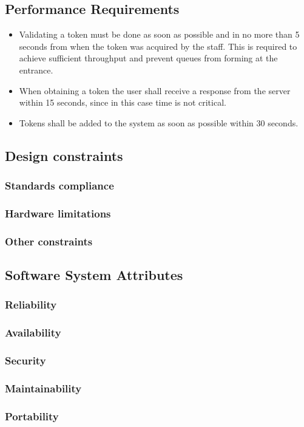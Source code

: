 \subsection{Performance Requirements}
\begin{itemize} 
\item Validating a token must be done as soon as possible and in no more than 5 seconds from when the token was acquired by the staff. This is required to achieve sufficient throughput and prevent queues from forming at the entrance.
\item When obtaining a token the user shall receive a response from the server within 15 seconds, since in this case time is not critical.
\item Tokens shall be added to the system as soon as possible within 30 seconds.
\end{itemize}
\subsection{Design constraints}
\subsubsection{Standards compliance}
\subsubsection{Hardware limitations}
\subsubsection{Other constraints}

\subsection{Software System Attributes}
\subsubsection{Reliability}
\subsubsection{Availability}
\subsubsection{Security}
\subsubsection{Maintainability}
\subsubsection{Portability}